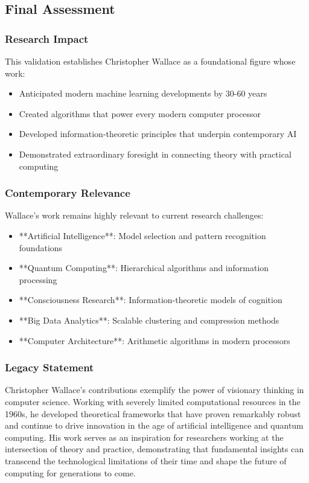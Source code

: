 \subsection{Final Assessment}

\subsubsection{Research Impact}

This validation establishes Christopher Wallace as a foundational figure whose work:
\begin{itemize}
    \item Anticipated modern machine learning developments by 30-60 years
    \item Created algorithms that power every modern computer processor
    \item Developed information-theoretic principles that underpin contemporary AI
    \item Demonstrated extraordinary foresight in connecting theory with practical computing
\end{itemize}

\subsubsection{Contemporary Relevance}

Wallace's work remains highly relevant to current research challenges:
\begin{itemize}
    \item **Artificial Intelligence**: Model selection and pattern recognition foundations
    \item **Quantum Computing**: Hierarchical algorithms and information processing
    \item **Consciousness Research**: Information-theoretic models of cognition
    \item **Big Data Analytics**: Scalable clustering and compression methods
    \item **Computer Architecture**: Arithmetic algorithms in modern processors
\end{itemize}

\subsubsection{Legacy Statement}

Christopher Wallace's contributions exemplify the power of visionary thinking in computer science. Working with severely limited computational resources in the 1960s, he developed theoretical frameworks that have proven remarkably robust and continue to drive innovation in the age of artificial intelligence and quantum computing. His work serves as an inspiration for researchers working at the intersection of theory and practice, demonstrating that fundamental insights can transcend the technological limitations of their time and shape the future of computing for generations to come.


